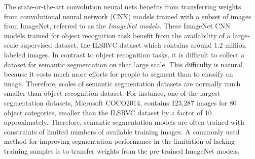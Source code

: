 

The state-or-the-art convolution neural nets benefits from transferring weights from convolutional neural network (CNN) models trained with a subset of images from ImageNet, referred to as the \textit{ImageNet models}.\cite{long2015fully,chen2016deeplab,he2017mask}
These ImageNet CNN models\cite{krizhevsky2012imagenet,simonyan2014very,szegedy2015going,he2016deep} trained for object recognition task benefit from the availability of a large-scale supervised dataset, the ILSRVC dataset\cite{russakovsky2015imagenet} which contains around 1.2 million labeled images.
In contrast to object recognition tasks, it is difficult to collect a dataset for semantic segmentation on that large scale.
This difficulty is natural because it costs much more efforts for people to segment than to classify an image.
Therefore, scales of semantic segmentation datasets are normally much smaller than object recognition dataset.
For instance, one of the largest segmentation datasets, Microsoft COCO2014\cite{lin2014microsoft}, contains 123,287 images for 80 object categories, smaller than the ILSRVC dataset by a factor of 10 approximately.
Therefore, semantic segmentation models are often trained with constraints of limited numbers of available training images.
A commonly used method for improving segmentation performance in the limitation of lacking training samples is to transfer weights from the pre-trained ImageNet models.\cite{long2015fully,chen2016deeplab}


